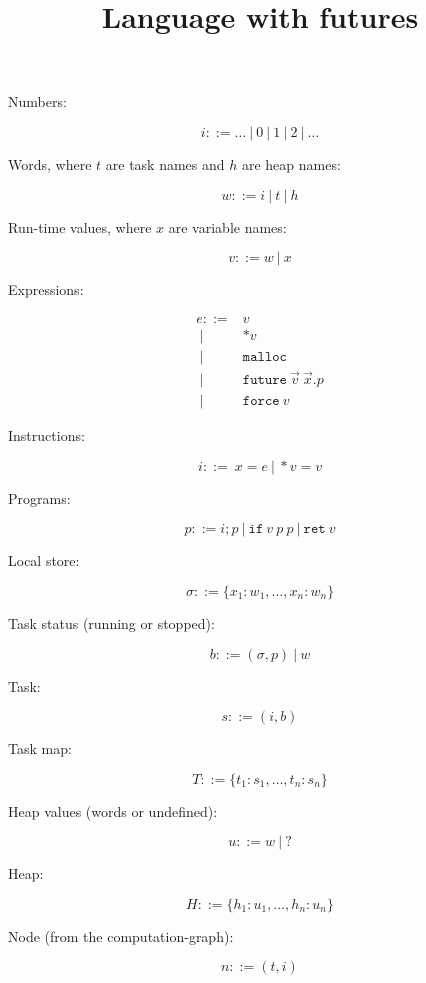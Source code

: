 \documentclass{article}
\title{Language with futures}
\date{}
\newcommand{\Prog}{p}
\newcommand{\Word}{w}
\newcommand{\Val}{v}
\newcommand{\HeapMap}{H}
\newcommand{\TaskMap}{T}
\newcommand{\Task}{s}
\newcommand{\TName}{t}
\newcommand{\HName}{h}
\newcommand{\Inst}{i}
\newcommand{\RET}[1][\Val]{\mathtt{ret}\ {#1}}
\newcommand{\Var}{x}
\newcommand{\Exp}{e}
\newcommand{\Deref}[1][\Val]{*{#1}}
\newcommand{\Nat}{i}
\newcommand{\Malloc}{\mathtt{malloc}}
\newcommand{\Future}[3]{\mathtt{future}\ {#1}\ {#2}.{#3}}
\newcommand{\Force}[1][\Val]{\mathtt{force}\ {#1}}
\newcommand{\If}[3][\Val]{\mathtt{if}\ {#1}\ {#2}\ {#3}}
\newcommand{\TStatus}{b}
\newcommand{\HeapVal}{u}
\newcommand{\Node}{n}
\newcommand{\grmor}{|}
\newcommand{\Grmor}{\ \grmor\ }
\newcommand{\Grmeq}{::=}
\begin{document}
\maketitle

Numbers:

$$
\Nat \Grmeq \dots \Grmor 0 \Grmor 1 \Grmor 2 \Grmor \dots
$$

Words, where $\TName$ are task names and $\HName$ are heap names:

$$
\Word \Grmeq \Nat \Grmor \TName \Grmor \HName
$$

Run-time values, where $\Var$ are variable names:

$$
\Val \Grmeq \Word \Grmor \Var
$$

Expressions:

$$
\begin{aligned}
\Exp    \Grmeq & \Val  \\
        \Grmor & \Deref \\
        \Grmor & \Malloc \\
        \Grmor & \Future {\vec \Val}  {\vec \Var} \Prog \\
        \Grmor & \Force 
\end{aligned}
$$

Instructions:

$$
\Inst   ::=\  \Var = \Exp \ |\ * \Val = \Val 
$$

Programs:

$$
\Prog ::= \Inst; \Prog \ |\ \If \Prog \Prog \ |\ \RET
$$

Local store:

$$
\sigma ::= \{\Var_1:\Word_1,\dots,\Var_n:\Word_n\}
$$

Task status (running or stopped):

$$
\TStatus \Grmeq (\sigma, \Prog) \Grmor \Word
$$

Task:

$$
\Task \Grmeq (\Nat,\TStatus)
$$

Task map:

$$
\TaskMap ::= \{\TName_1:\Task_1,\dots,\TName_n:\Task_n\}
$$

Heap values (words or undefined):

$$
\HeapVal \Grmeq \Word \Grmor ?
$$

Heap:

$$
\HeapMap ::= \{\HName_1\colon \HeapVal_1,\dots,\HName_n\colon \HeapVal_n\}
$$

Node (from the computation-graph):

$$
\Node \Grmeq (\TName,\Nat)
$$
\end{document}
